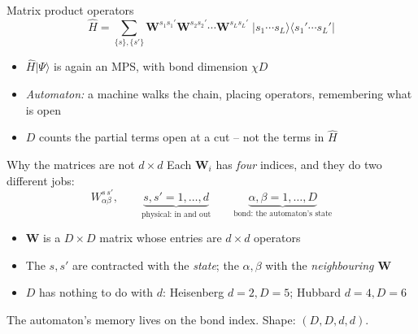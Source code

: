 \documentclass[aspectratio=169,10pt]{beamer}
\newcommand{\ket}[1]{\vert #1\rangle}
\newcommand{\bra}[1]{\langle #1\vert}
\newcommand{\bmat}[1]{\bm{#1}}
\newcommand{\hH}{\hat{H}}
\begin{document}
\begin{frame}{Matrix product operators}
  \[
    \hH=\sum_{\{s\},\{s'\}}\bmat W^{s_1s_1'}\bmat W^{s_2s_2'}\cdots\bmat W^{s_Ls_L'}\;\ket{s_1\cdots s_L}\bra{s_1'\cdots s_L'}
  \]
  \begin{center}
  \end{center}
  \begin{itemize}
    \item $\hH\ket\Psi$ is again an MPS, with bond dimension $\chi D$
    \item \emph{Automaton:} a machine walks the chain, placing operators, remembering what is open
    \item \alert{$D$ counts the partial terms open at a cut} -- not the terms in $\hH$
  \end{itemize}
\end{frame}

\begin{frame}{Why the matrices are not $d\times d$}
  Each $\bmat W_i$ has \emph{four} indices, and they do two different jobs:
  \[
    W^{s\,s'}_{\alpha\beta},\qquad
    \underbrace{s,s'=1,\dots,d}_{\text{physical: in and out}}\qquad
    \underbrace{\alpha,\beta=1,\dots,D}_{\text{bond: the automaton's state}}
  \]
  \begin{itemize}
    \item $\bmat W$ is a $D\times D$ \alert{matrix whose entries are $d\times d$ operators}
    \item The $s,s'$ are contracted with the \emph{state}; the $\alpha,\beta$ with the \emph{neighbouring $\bmat W$}
    \item $D$ has nothing to do with $d$: Heisenberg $d=2,D=5$; Hubbard $d=4,D=6$
  \end{itemize}
  \vspace{0.4em}
  \centering The automaton's memory lives on the bond index. Shape: $(D,D,d,d)$.
\end{frame}
\end{document}
